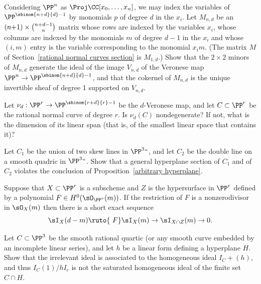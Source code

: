\begin{exercise}\label{equations of Veroneses}
Considering $\PP^n$ as $\Proj \CC[x_0,\dots,x_n]$, we may index the
variables
of $\PP^{\sbinom{n+d}{d}-1}$ by  monomials $p$
of degree $d$ in the $x_i$. Let $M_{n,d}$ be an $(n{+}1)\times \tbinom{n+d-1}{n}$ matrix
whose rows are indexed by the variables $x_i$, whose columns are indexed by the monomials $m$ of degree $d-1$ in the $x_i$ and
whose $(i,m)$ entry is the variable corresponding to the monomial $x_im$. (The matrix
$M$ of Section~\ref{rational normal curves section} is $M_{1,d}$.)
Show that the $2\times 2$ minors of $M_{n,d}$ generate the ideal of the image $V_{n,d}$ of the Veronese map
$\PP^n\to \PP^{\sbinom{n+d}{d}-1}$, and that the cokernel of $M_{n,d}$ is the unique invertible sheaf of degree 1 supported on $V_{n,d}$.
\end{exercise}

\begin{exercise}
 Let $\nu_d: \PP^r \to \PP^{\sbinom{r+d}{r}-1}$ be the $d$-Veronese
 map, and let $C\subset \PP^r$ be the
rational normal curve
%
of degree $r$. Is $\nu_d(C)$ nondegenerate? If not, what is the dimension of its linear span (that is, of the smallest linear
 space that contains it)?
\end{exercise}

\begin{exercise}\label{arbitrary hyperplane examples}
Let $C_1$ be the union of two
\vadjust{\allowbreak}%
skew lines
%
in $\PP^3` `$, and let $C_2$ be the
double line
%
on a smooth quadric in $\PP^3` `$.
Show that a general hyperplane section of $C_1$ and of $C_2$  violates the conclusion of Proposition~\ref{arbitrary hyperplane}.
\end{exercise}

\begin{exercise}\label{restriction of ideals}
Suppose that $X\subset \PP^r$ is a subscheme and  $Z$ is the hypersurface in $\PP^r$ defined by a polynomial $F\in H^0(\sO_{\PP^r}(m))$. If the restriction of $F$ is a nonzerodivisor in
$\sO_X(m)$  then there is a short exact sequence
%
$$
\sI_X(d-m) \ruto {\ F} \sI_X(m) \to \sI_{X\cap Z}(m) \to 0.
$$
\end{exercise}

\begin{exercise}\label{bad restriction}
Let $C\subset \PP^3$ be the smooth rational quartic
%
(or any smooth curve embedded by an incomplete linear series), and let
$h$ be a linear form defining a hyperplane $H$.
Show that
the  irrelevant ideal is associated to the
homogeneous ideal $I_C+(h)$, and thus $I_C(1)/hI_c$ is not the saturated homogeneous ideal of the finite
set $C\cap H$.
\end{exercise}

